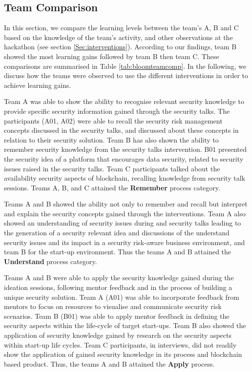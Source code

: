 \documentclass[runningheads]{llncs}
\begin{document}
\subsection{Team Comparison} \label{teamcomparison}
In this section, we compare the learning levels between the team's A, B and C based on the knowledge of the team's activity, and other observations at the hackathon (see section \ref{Sec:interventions}). According to our findings, team B showed the most learning gains followed by team B then team C. These comparisons are summarised in Table \ref{tab:bloomteamcomp}. In the following, we discuss how the teams were observed to use the different interventions in order to achieve learning gains.


Team A was able to show the ability to recognise relevant security knowledge to provide specific security information gained through the security talks. The participants (A01, A02) were able to recall the security risk management concepts discussed in the security talks, and discussed about these concepts in relation to their security solution. 
Team B has also shown the ability to remember security knowledge from the security talks intervention. B01 presented the security idea of a platform that encourages data security, related to security issues raised in the security talks. Team C participants talked about the availability security aspects of blockchain, recalling knowledge from security talk sessions. Teams A, B, and C attained the \textbf{Remember} process category.

Teams A and B showed the ability not only to remember and recall but interpret and explain the security concepts gained through the interventions. Team A also showed an understanding of security issues during and security talks leading to the generation of a security relevant idea and discussions of the understand security issues and its impact in a security risk-aware business environment, and team B for the start-up environment.  Thus the teams A and B attained the \textbf{Understand} process category.

Teams A and B were able to apply the security knowledge gained during the ideation sessions, following mentor feedback and in the process of building a unique security solution.
Team A (A01) was able to incorporate feedback from mentors to focus on resources to visualise and communicate security risk scenarios. Team B (B01) was able to apply mentor feedback in defining the security aspects within the life-cycle of target start-ups. Team B also showed the application of security knowledge gained by research on the security aspects within start-up life cycles. Team C participants, in interviews, did not readily show the application of gained security knowledge in its process and blockchain based product. Thus, the teams A and B attained the \textbf{Apply} process.
\end{document}
